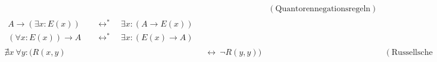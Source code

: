 \begin{align*}
\begin{split}
    \end{split} && (\text{Quantorennegationsregeln}) \\[1em]
    \begin{split}
        A \to( \exists x : E(x)) & \quad\leftrightarrow^*\quad \exists x : ( A\to E(x)) \\ %
        (\forall x : E(x)) \to A & \quad\leftrightarrow^*\quad \exists x : (E(x) \to A) %
    \end{split} \\[1em]
    \nexists x\ \forall y : (R(x,y) & \ \leftrightarrow\ \neg R(y,y)) && (\text{Russellsche Antinomie})
\end{align*}
\endgroup





